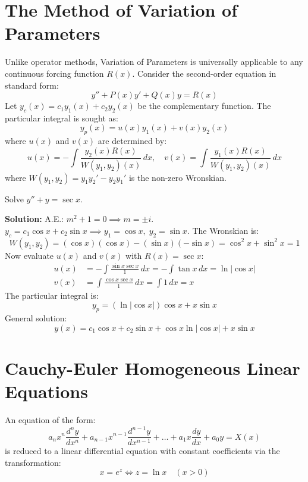 \section{The Method of Variation of Parameters}
Unlike operator methods, Variation of Parameters is universally applicable to any continuous forcing function $R(x)$.
Consider the second-order equation in standard form:
\begin{equation}
y'' + P(x)y' + Q(x)y = R(x)
\end{equation}
Let $y_c(x) = c_1 y_1(x) + c_2 y_2(x)$ be the complementary function. The particular integral is sought as:
\begin{equation}
y_p(x) = u(x) y_1(x) + v(x) y_2(x)
\end{equation}
where $u(x)$ and $v(x)$ are determined by:
\begin{equation}
u(x) = -\int \frac{y_2(x) R(x)}{W(y_1, y_2)(x)} \, dx, \quad v(x) = \int \frac{y_1(x) R(x)}{W(y_1, y_2)(x)} \, dx
\end{equation}
where $W(y_1, y_2) = y_1 y_2' - y_2 y_1'$ is the non-zero Wronskian.

\begin{example}
Solve $y'' + y = \sec x$.

\textbf{Solution:}
A.E.: $m^2 + 1 = 0 \implies m = \pm i$.
$y_c = c_1 \cos x + c_2 \sin x \implies y_1 = \cos x, \; y_2 = \sin x$.
The Wronskian is:
\begin{equation*}
W(y_1, y_2) = (\cos x)(\cos x) - (\sin x)(-\sin x) = \cos^2 x + \sin^2 x = 1
\end{equation*}
Now evaluate $u(x)$ and $v(x)$ with $R(x) = \sec x$:
\begin{align*}
u(x) &= -\int \frac{\sin x \sec x}{1} \, dx = -\int \tan x \, dx = \ln |\cos x| \\
v(x) &= \int \frac{\cos x \sec x}{1} \, dx = \int 1 \, dx = x
\end{align*}
The particular integral is:
\begin{equation*}
y_p = (\ln |\cos x|)\cos x + x \sin x
\end{equation*}
General solution:
\begin{equation*}
y(x) = c_1 \cos x + c_2 \sin x + \cos x \ln |\cos x| + x \sin x
\end{equation*}
\end{example}

\section{Cauchy-Euler Homogeneous Linear Equations}
\begin{definition}
An equation of the form:
\begin{equation}
a_n x^n \frac{d^n y}{dx^n} + a_{n-1} x^{n-1} \frac{d^{n-1} y}{dx^{n-1}} + \dots + a_1 x \frac{dy}{dx} + a_0 y = X(x)
\end{equation}
is reduced to a linear differential equation with constant coefficients via the transformation:
\begin{equation}
x = e^z \iff z = \ln x \quad (x > 0)
\end{equation}
\end{definition}

